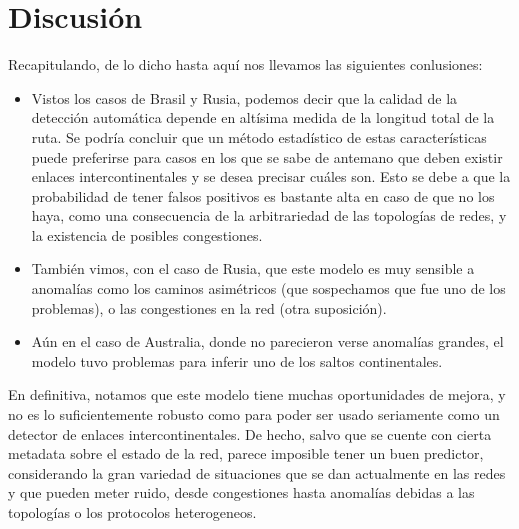 \section{Discusión}

Recapitulando, de lo dicho hasta aquí nos llevamos las siguientes conlusiones:

\begin{itemize}
	\item Vistos los casos de Brasil y Rusia, podemos decir que la calidad de la detección automática depende en altísima medida de la longitud total de la ruta. Se podría concluir que un método estadístico de estas características puede preferirse para casos en los que se sabe de antemano que deben existir enlaces intercontinentales y se desea precisar cuáles son. Esto se debe a que la probabilidad de tener falsos positivos es bastante alta en caso de que no los haya, como una consecuencia de la arbitrariedad de las topologías de redes, y la existencia de posibles congestiones.
	\item También vimos, con el caso de Rusia, que este modelo es muy sensible a anomalías como los caminos asimétricos (que sospechamos que fue uno de los problemas), o las congestiones en la red (otra suposición).
	\item Aún en el caso de Australia, donde no parecieron verse anomalías grandes, el modelo tuvo problemas para inferir uno de los saltos continentales.
\end{itemize}

En definitiva, notamos que este modelo tiene muchas oportunidades de mejora, y no es lo suficientemente robusto como para poder ser usado seriamente como un detector de enlaces intercontinentales. De hecho, salvo que se cuente con cierta metadata sobre el estado de la red, parece imposible tener un buen predictor, considerando la gran variedad de situaciones que se dan actualmente en las redes y que pueden meter ruido, desde congestiones hasta anomalías debidas a las topologías o los protocolos heterogeneos.

